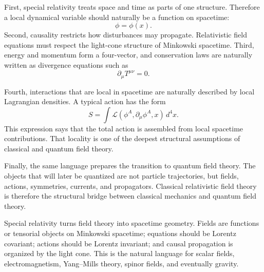 First, special relativity treats space and time as parts of one structure.
Therefore a local dynamical variable should naturally be a function on
spacetime:
\[
    \phi=\phi(x).
\]
Second, causality restricts how disturbances may propagate. Relativistic field
equations must respect the light-cone structure of Minkowski spacetime. Third,
energy and momentum form a four-vector, and conservation laws are naturally
written as divergence equations such as
\[
    \partial_\mu T^{\mu\nu}=0.
\]

Fourth, interactions that are local in spacetime are naturally described by
local Lagrangian densities. A typical action has the form
\[
    S=\int \mathcal{L}(\phi^A,\partial_\mu\phi^A,x)\,d^4x.
\]
This expression says that the total action is assembled from local spacetime
contributions. That locality is one of the deepest structural assumptions of
classical and quantum field theory.

Finally, the same language prepares the transition to quantum field theory. The
objects that will later be quantized are not particle trajectories, but fields,
actions, symmetries, currents, and propagators. Classical relativistic field
theory is therefore the structural bridge between classical mechanics and
quantum field theory.

\begin{summarybox}
Special relativity turns field theory into spacetime geometry. Fields are
functions or tensorial objects on Minkowski spacetime; equations should be
Lorentz covariant; actions should be Lorentz invariant; and causal propagation
is organized by the light cone. This is the natural language for scalar fields,
electromagnetism, Yang--Mills theory, spinor fields, and eventually gravity.
\end{summarybox}
